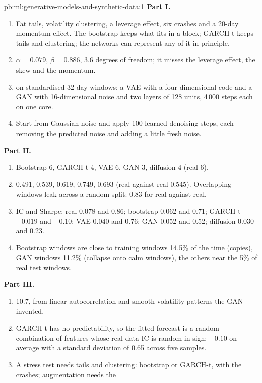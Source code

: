 \begin{solution}{pb:ml:generative-models-and-synthetic-data:1}
\textbf{Part I.}
\begin{enumerate}
\item Fat tails, volatility clustering, a leverage effect, six crashes and a 20-day momentum effect. The bootstrap keeps
what fits in a block; GARCH-t keeps tails and clustering; the networks can represent any of it in principle.
\item $\alpha = 0.079$, $\beta = 0.886$, 3.6 degrees of freedom; it misses the leverage effect, the skew and the momentum.
\item {} on standardised 32-day windows: a VAE with a four-dimensional code and a GAN with 16-dimensional
noise and two layers of 128 units, 4\,000  steps each on one core.
\item Start from Gaussian noise and apply 100 learned denoising steps, each removing the predicted noise and adding a little
fresh noise.
\end{enumerate}
\textbf{Part II.}
\begin{enumerate}[resume]
\item Bootstrap 6, GARCH-t 4, VAE 6, GAN 3, diffusion 4 (real 6).
\item 0.491, 0.539, 0.619, 0.749, 0.693 (real against real 0.545). Overlapping windows leak across a random split: 0.83 for
real against real.
\item IC and Sharpe: real 0.078 and 0.86; bootstrap 0.062 and 0.71; GARCH-t $-0.019$ and $-0.10$; VAE 0.040 and 0.76; GAN
0.052 and 0.52; diffusion 0.030 and 0.23.
\item Bootstrap windows are close to training windows 14.5\% of the time (copies), GAN windows 11.2\% (collapse onto calm
windows), the others near the 5\% of real test windows.
\end{enumerate}
\textbf{Part III.}
\begin{enumerate}[resume]
\item 10.7, from linear autocorrelation and smooth volatility patterns the GAN invented.
\item GARCH-t has no predictability, so the fitted forecast is a random combination of features whose real-data IC is
random in sign: $-0.10$ on average with a standard deviation of 0.65 across five samples.
\item A stress test needs tails and clustering: bootstrap or GARCH-t, with the crashes; augmentation needs the

\end{enumerate}
\end{solution}
